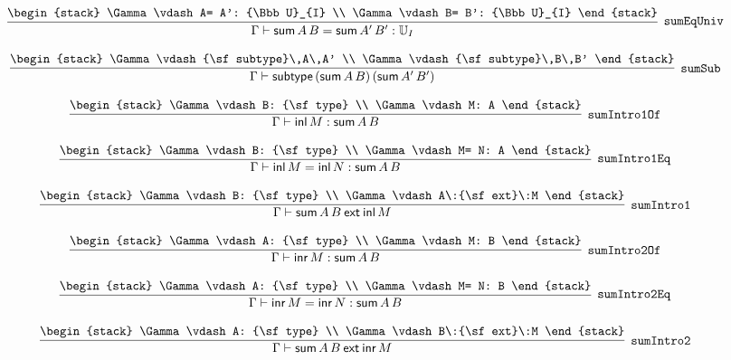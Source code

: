 \[
\infer[{\tt sumEqUniv}]{\Gamma \vdash {\sf sum}\,A\,B= {\sf sum}\,A'\,B': {\Bbb U}_{I}}{
\begin{stack}
\Gamma \vdash A= A': {\Bbb U}_{I}
\\
\Gamma \vdash B= B': {\Bbb U}_{I}
\end{stack}}
\]

\[
\infer[{\tt sumSub}]{\Gamma \vdash {\sf subtype}\,({\sf sum}\,A\,B)\,({\sf sum}\,A'\,B')}{
\begin{stack}
\Gamma \vdash {\sf subtype}\,A\,A'
\\
\Gamma \vdash {\sf subtype}\,B\,B'
\end{stack}}
\]

\[
\infer[{\tt sumIntro1Of}]{\Gamma \vdash {\sf inl}\,M: {\sf sum}\,A\,B}{
\begin{stack}
\Gamma \vdash B: {\sf type}
\\
\Gamma \vdash M: A
\end{stack}}
\]

\[
\infer[{\tt sumIntro1Eq}]{\Gamma \vdash {\sf inl}\,M= {\sf inl}\,N: {\sf sum}\,A\,B}{
\begin{stack}
\Gamma \vdash B: {\sf type}
\\
\Gamma \vdash M= N: A
\end{stack}}
\]

\[
\infer[{\tt sumIntro1}]{\Gamma \vdash {\sf sum}\,A\,B\:{\sf ext}\:{\sf inl}\,M}{
\begin{stack}
\Gamma \vdash B: {\sf type}
\\
\Gamma \vdash A\:{\sf ext}\:M
\end{stack}}
\]

\[
\infer[{\tt sumIntro2Of}]{\Gamma \vdash {\sf inr}\,M: {\sf sum}\,A\,B}{
\begin{stack}
\Gamma \vdash A: {\sf type}
\\
\Gamma \vdash M: B
\end{stack}}
\]

\[
\infer[{\tt sumIntro2Eq}]{\Gamma \vdash {\sf inr}\,M= {\sf inr}\,N: {\sf sum}\,A\,B}{
\begin{stack}
\Gamma \vdash A: {\sf type}
\\
\Gamma \vdash M= N: B
\end{stack}}
\]

\[
\infer[{\tt sumIntro2}]{\Gamma \vdash {\sf sum}\,A\,B\:{\sf ext}\:{\sf inr}\,M}{
\begin{stack}
\Gamma \vdash A: {\sf type}
\\
\Gamma \vdash B\:{\sf ext}\:M
\end{stack}}
\]


